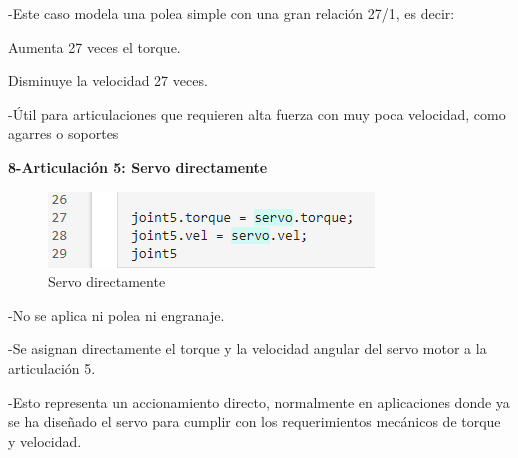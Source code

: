 -Este caso modela una polea simple con una gran relación 27/1, es decir:

Aumenta 27 veces el torque.

Disminuye la velocidad 27 veces.

-Útil para articulaciones que requieren alta fuerza con muy poca velocidad, como agarres o soportes


\textbf{8-Articulación 5: Servo directamente}


\begin{figure} [h]
	\centering
	\includegraphics[width=0.7\linewidth]{img/calculomotores8}
	\caption{Servo directamente}
	\label{fig:calculomotores8}
\end{figure}


-No se aplica ni polea ni engranaje.

-Se asignan directamente el torque y la velocidad angular del servo motor a la articulación 5.

-Esto representa un accionamiento directo, normalmente en aplicaciones donde ya se ha diseñado el servo para cumplir con los requerimientos mecánicos de torque y velocidad.


